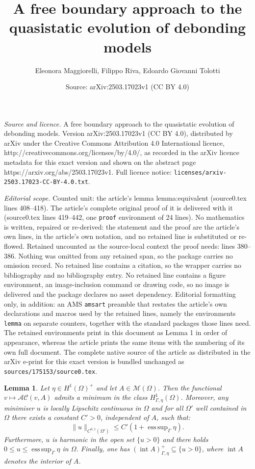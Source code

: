 \documentclass[10pt,a4paper]{amsart}
\title{A free boundary approach to the quasistatic evolution of debonding models}
\author{Eleonora Maggiorelli, Filippo Riva, Edoardo Giovanni Tolotti}
\date{Source: arXiv:2503.17023v1 (CC BY 4.0)}
\newtheorem{lemma}{Lemma}
\DeclareMathOperator*{\esssup}{ess\, sup}
\DeclareMathOperator{\inter}{int}
\begin{document}
\maketitle

\noindent\emph{Source and licence.} A free boundary approach to the quasistatic evolution of debonding models. Version arXiv:2503.17023v1 (CC BY 4.0), distributed by arXiv under the Creative Commons Attribution 4.0 International licence, http://creativecommons.org/licenses/by/4.0/, as recorded in the arXiv licence metadata for this exact version and shown on the abstract page https://arxiv.org/abs/2503.17023v1. Full licence notice: \texttt{licenses/arxiv-2503.17023-CC-BY-4.0.txt}.\par\smallskip

\noindent\textit{Editorial scope.} Counted unit: the article's lemma lemma:equivalent (source0.tex lines 408--418). The article's complete original proof of it is delivered with it (source0.tex lines 419--442, one \texttt{proof} environment of 24 lines). No mathematics is written, repaired or re-derived: the statement and the proof are the article's own lines, in the article's own notation, and no retained line is substituted or re-flowed.  Retained uncounted as the source-local context the proof needs: lines 380--386.  Nothing was omitted from any retained span, so the package carries no omission record.  No retained line contains a citation, so the wrapper carries no bibliography and no bibliography entry.  No retained line contains a figure environment, an image-inclusion command or drawing code, so no image is delivered and the package declares no asset dependency.  Editorial formatting only, in addition: an AMS \texttt{amsart} preamble that restates the article's own declarations and macros used by the retained lines, namely the environments \texttt{lemma} on separate counters, together with the standard packages those lines need.  The retained environments print in this document as Lemma 1 in order of appearance, whereas the article prints the same items with the numbering of its own full document.  The complete native source of the article as distributed in the arXiv e-print for this exact version is bundled unchanged as \texttt{sources/175153/source0.tex}.
\begin{lemma}\label{lemma:minimiser_AltCaffarelli}
Let $\eta\in H^1(\Omega)^+$ and let $A\in \mathcal M(\Omega)$. Then the functional $v\mapsto \mathcal{AC}(v,A)$ admits a minimum in the class $H^1_{\Gamma,\eta}(\Omega)$. Moreover, any minimiser $u$ is locally Lipschitz continuous in $\Omega$ and for all $\Omega'$ well contained in $\Omega$ there exists a constant $C'>0$, independent of $A$, such that:
\begin{equation}
    \|u\|_{C^{0,1}(\Omega')}\leq C'(1+\esssup_\Gamma\eta).
\end{equation}
Furthermore, $u$ is harmonic in the open set $\{u>0\}$ and there holds $0\leq u\leq \esssup_\Gamma\eta$ in $\Omega$. Finally, one has $(\inter A)^+_{\Gamma,\eta}\subseteq\{u>0\}$, where $\inter A$ denotes the interior of $A$.
\end{lemma}
\end{document}
